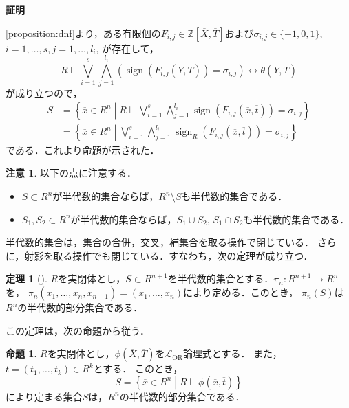 \documentclass[uplatex, dvipdfmx]{jsarticle}
\makeatletter
\numberwithin{equation}{section}
\renewenvironment{proof}[1][\proofname]{\par
  \pushQED{\qed}%
  \normalfont \topsep6\p@\@plus6\p@\relax
  \trivlist
  \item\relax
  {\bfseries
  #1\@addpunct{.}}\hspace\labelsep\ignorespaces
}{
  \popQED\endtrivlist\@endpefalse
}
\newcommand{\Z}{\mathbb{Z}}
\newcommand{\map}[3]{{#1}\colon{#2}\rightarrow{#3}}
\DeclareMathOperator{\sign}{sign}
\theoremstyle{definition}
\newtheorem{proposition}[definition]{命題}
\newtheorem{theorem}[definition]{定理}
\newtheorem{remark}[definition]{注意}
\renewcommand{\proofname}{\textbf{証明}}
\makeatother
\begin{document}
\begin{proof}
     \cref{proposition:dnf}より，ある有限個の$F_{i,j} \in \Z\left[\overline{X}, \overline{T}\right]$および$\sigma_{i,j} \in \{-1, 0 ,1\}$, $i=1, \dots, s, j = 1, \dots, l_i$, が存在して，
     \begin{equation}
          R \models
          \bigvee_{i=1}^s \bigwedge_{j=1}^{l_i}(\sign(F_{i,j}(\overline{Y}, \overline{T}))=\sigma_{i,j})
          \leftrightarrow \theta(\overline{Y},\overline{T})
     \end{equation}
     が成り立つので，
     \begin{align}
          S &= \left\{ \overline{x} \in R^n \middle| R \models \bigvee_{i=1}^s \bigwedge_{j=1}^{l_i} \sign(F_{i,j}(\overline{x}, \overline{t})) = \sigma_{i,j} \right\}\\
            &= \left\{ \overline{x} \in R^n \middle| \bigvee_{i=1}^s \bigwedge_{j=1}^{l_i} \sign_R(F_{i,j}(\overline{x}, \overline{t})) = \sigma_{i,j} \right\}
     \end{align}
     である．これより命題が示された．
\end{proof}


\begin{remark}
     以下の点に注意する．
     \begin{itemize}
          \item 
               $S \subset R^n$が半代数的集合ならば，$R^n \setminus S$も半代数的集合である．
          \item 
               $S_1, S_2 \subset R^n$が半代数的集合ならば，$S_1 \cup S_2$, $S_1 \cap S_2$も半代数的集合である．
     \end{itemize}
\end{remark}

半代数的集合は，集合の合併，交叉，補集合を取る操作で閉じている．
さらに，射影を取る操作でも閉じている．すなわち，次の定理が成り立つ．

\begin{theorem}[{\cite[Theorem 2.2.1]{MR1659509}}]\label{theorem:Tarski-Seidenberg}
     $R$を実閉体とし，$S \subset R^{n+1}$を半代数的集合とする．$\map{\pi_{n}}{R^{n+1}}{R^n}$を，
     $\pi_{n}(x_1, \dots, x_n, x_{n+1}) = (x_1, \dots, x_n)$により定める．このとき，
     $\pi_{n}(S)$は$R^n$の半代数的部分集合である．
\end{theorem}

この定理は，次の命題から従う．

\begin{proposition} \label{proposition:Seidenberg-Tarski-generalization}
     $R$を実閉体とし，$\phi\left(\overline{X}, \overline{T}\right)$を$\mathcal{L}_\mathrm{OR}$論理式とする．
     また，$\overline{t} = (t_1, \dots, t_k) \in R^k$とする．
     このとき，
     \begin{equation}
          S = \left\{\overline{x} \in R^n \middle| R \models \phi\left(\overline{x},\overline{t}\right) \right\}
     \end{equation}
     により定まる集合$S$は，$R^n$の半代数的部分集合である．
\end{proposition}
\end{document}
